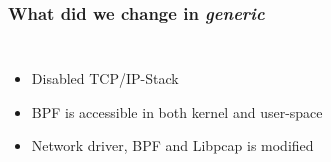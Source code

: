 \documentclass{beamer}
\begin{document}
\begin{frame}
	\frametitle{What did we change in \emph{generic}}
\begin{columns}
\begin{itemize}
	\item <2->Disabled TCP/IP-Stack\newline
	\item <3->BPF is accessible in both kernel and user-space\newline
	\item <4->Network driver, BPF and Libpcap is modified\newline
\end{itemize}
\vspace{-2em}

\end{columns}
\end{frame}
\end{document}

